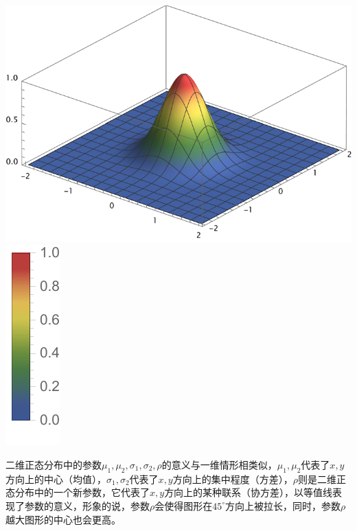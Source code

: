 \begin{Figure}[二维正态分布]
    \includegraphics[scale=0.75]{Mathematica/output/Gauss2D44.pdf}
    \hspace{0.2cm}
    \includegraphics[scale=1.0]{Mathematica/output/Gauss2DColorbar.pdf}
\end{Figure}
二维正态分布中的参数$\mu_1,\mu_2,\sigma_1,\sigma_2,\rho$的意义与一维情形相类似，$\mu_1,\mu_2$代表了$x,y$方向上的中心（均值），$\sigma_1,\sigma_2$代表了$x,y$方向上的集中程度（方差），$\rho$则是二维正态分布中的一个新参数，它代表了$x,y$方向上的某种联系（协方差），以等值线表现了参数的意义，形象的说，参数$\rho$会使得图形在$45^{\circ}$方向上被拉长，同时，参数$\rho$越大图形的中心也会更高。

